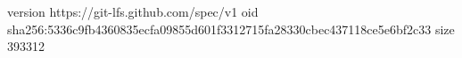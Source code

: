 version https://git-lfs.github.com/spec/v1
oid sha256:5336c9fb4360835ecfa09855d601f3312715fa28330cbec437118ce5e6bf2c33
size 393312
